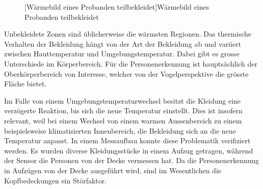 \begin{figure}[!ht]
\begin{minipage}[b]{0.45\linewidth}
		[Wärmebild eines Probanden teilbekleidet]{Wärmebild eines Probanden teilbekleidet}
		\label{fig:Waermebild2}	
	\end{minipage}
\end{figure}

 Unbekleidete Zonen sind üblicherweise die wärmsten Regionen. Das thermische Verhalten der Bekleidung hängt von der Art der Bekleidung ab und variiert zwischen Hauttemperatur und Umgebungstemperatur. Dabei gibt es grosse Unterschiede im Körperbereich. Für die Personenerkennung ist hauptsächlich der Oberkörperbereich von Interesse, welcher von der Vogelperspektive die grösste Fläche bietet.
 
 Im Falle von einem Umgebungstemperaturwechsel besitzt die Kleidung eine verzögerte Reaktion, bis sich die neue Temperatur einstellt. 
 Dies ist insofern relevant, weil bei einem Wechsel von einem warmen Aussenbereich zu einem beispielsweise klimatisierten Innenbereich, die Bekleidung sich an die neue Temperatur anpasst. In einem Messaufbau konnte diese Problematik verifiziert werden. Es wurden diverse Kleidungsstücke in einem Aufzug getragen, während der Sensor die Personen von der Decke vermessen hat. Da die Personenerkennung in Aufzügen von der Decke ausgeführt wird, sind im Wesentlichen die Kopfbedeckungen ein Störfaktor.

